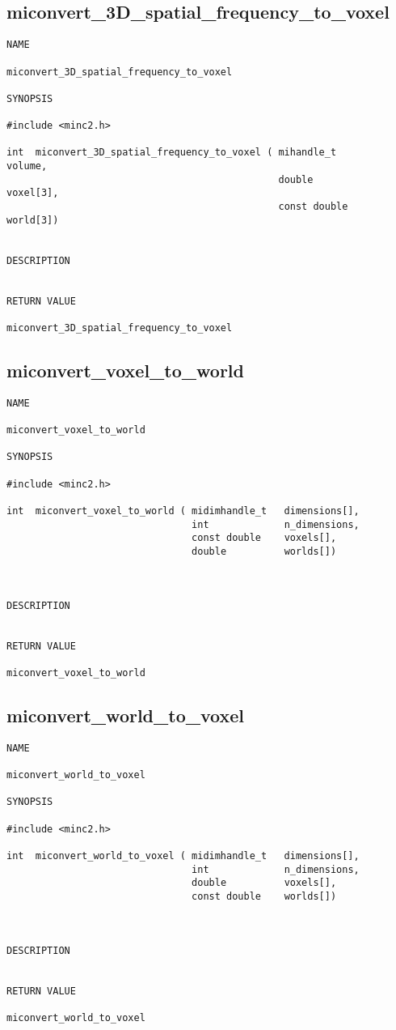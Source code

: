 \documentclass{article}
\begin{document}
\subsection{miconvert\_3D\_spatial\_frequency\_to\_voxel}
\begin{verbatim}
NAME 

miconvert_3D_spatial_frequency_to_voxel

SYNOPSIS

#include <minc2.h>

int  miconvert_3D_spatial_frequency_to_voxel ( mihandle_t            volume,
                                               double                voxel[3],
                                               const double          world[3])
                       
                                
DESCRIPTION


RETURN VALUE

miconvert_3D_spatial_frequency_to_voxel
\end{verbatim}

\subsection{miconvert\_voxel\_to\_world}
\begin{verbatim}
NAME 

miconvert_voxel_to_world

SYNOPSIS

#include <minc2.h>

int  miconvert_voxel_to_world ( midimhandle_t   dimensions[],
                                int             n_dimensions,
                                const double    voxels[],
                                double          worlds[])
                                   
                       
                                
DESCRIPTION


RETURN VALUE

miconvert_voxel_to_world
\end{verbatim}

\subsection{miconvert\_world\_to\_voxel}
\begin{verbatim}
NAME 

miconvert_world_to_voxel

SYNOPSIS

#include <minc2.h>

int  miconvert_world_to_voxel ( midimhandle_t   dimensions[],
                                int             n_dimensions,
                                double          voxels[],
                                const double    worlds[])
                                   
                       
                                
DESCRIPTION


RETURN VALUE

miconvert_world_to_voxel
\end{verbatim}
\end{document}

